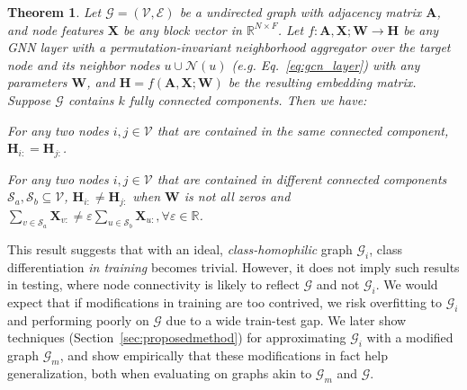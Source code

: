 \documentclass[letterpaper]{article} \usepackage{aaai21}  \usepackage{times}  \usepackage{helvet} \usepackage{courier}  \usepackage[hyphens]{url}  \usepackage{graphicx} \urlstyle{rm} \def\UrlFont{\rm}  \usepackage{natbib}  \usepackage{caption} \frenchspacing  \setlength{\pdfpagewidth}{8.5in}  \setlength{\pdfpageheight}{11in}
\newtheorem{theorem}{Theorem}\newtheorem{corollary}[theorem]{Corollary}
\begin{document}
\begin{theorem}
\label{thm:1}
Let $\mathcal{G}=(\mathcal{V}, \mathcal{E})$ be a undirected graph with adjacency matrix $\mathbf{A}$, and node features $\mathbf{X}$ be any block vector in $\mathbb{R}^{N\times F}$. Let $f: \mathbf{A}, \mathbf{X}; \mathbf{W} \rightarrow \mathbf{H}$ be any GNN layer with a permutation-invariant neighborhood aggregator over the target node and its neighbor nodes $u \cup \mathcal{N}(u)$ (e.g. Eq.~\ref{eq:gcn_layer}) with any parameters $\mathbf{W}$, and $\mathbf{H} = f(\mathbf{A}, \mathbf{X}; \mathbf{W})$ be the resulting embedding matrix. Suppose $\mathcal{G}$ contains $k$ fully connected components. Then we have:
\begin{compactenum}
    \item For any two nodes $i, j \in \mathcal{V}$ that are contained in the same connected component, $\mathbf{H}_{i:} = \mathbf{H}_{j:}$.
    \item For any two nodes $i, j \in \mathcal{V}$ that are contained in different connected components $\mathcal{S}_a, \mathcal{S}_b \subseteq \mathcal{V}$, $\mathbf{H}_{i:} \neq \mathbf{H}_{j:}$ when $\mathbf{W}$ is not all zeros and $\sum_{v \in \mathcal{S}_a}{\mathbf{X}_{v:}} \neq \varepsilon \sum_{u \in \mathcal{S}_b}{\mathbf{X}_{u:}}, \forall \varepsilon \in \mathbb{R}$.
\end{compactenum}
\end{theorem}

This result suggests that with an ideal, \emph{class-homophilic} graph $\mathcal{G}_i$, class differentiation \emph{in training} becomes trivial.  However, it does not imply such results in testing, where node connectivity is likely to reflect $\mathcal{G}$ and not $\mathcal{G}_i$.
We would expect that if modifications in training are too contrived, we risk overfitting to $\mathcal{G}_i$ and performing poorly on $\mathcal{G}$ due to a wide train-test gap.  We later show techniques (Section~\ref{sec:proposedmethod}) for approximating $\mathcal{G}_i$ with a modified graph $\mathcal{G}_m$, and show empirically that these modifications in fact help generalization, both when evaluating on graphs akin to $\mathcal{G}_m$ and $\mathcal{G}$.
\end{document}

